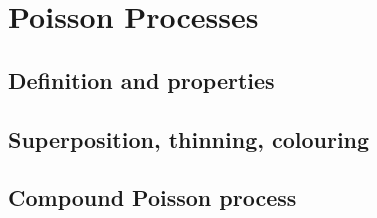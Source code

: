 
\section{Poisson Processes}

\subsection{Definition and properties}


\subsection{Superposition, thinning, colouring}


\subsection{Compound Poisson process}

